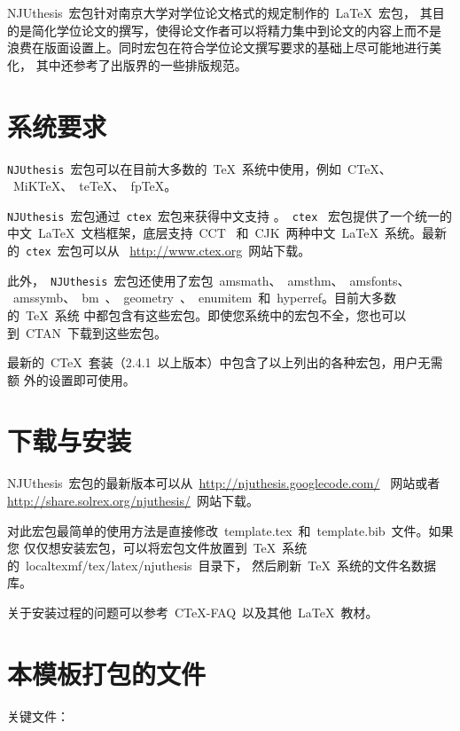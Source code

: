 \documentclass[oneside, phd]{njuthesis}
\begin{document}
NJUthesis~宏包针对南京大学对学位论文格式的规定制作的~\LaTeX{}~宏包，
其目的是简化学位论文的撰写，使得论文作者可以将精力集中到论文的内容上而不是
浪费在版面设置上。同时宏包在符合学位论文撰写要求的基础上尽可能地进行美化，
其中还参考了出版界的一些排版规范。

\section{系统要求}

\texttt{NJUthesis}~宏包可以在目前大多数的~\TeX{}~系统中使用，例如~C\TeX{}、
 ~MiK\TeX{}、~te\TeX{}、~fp\TeX{}。

\texttt{NJUthesis}~宏包通过~\texttt{ctex}~宏包来获得中文支持
。~\texttt{ctex}~ 宏包提供了一个统一的中文~\LaTeX{}~文档框架，底层支持~CCT~
和~CJK~两种中文~\LaTeX{}~系统。最新的~\texttt{ctex}~宏包可以从~
\url{http://www.ctex.org}~网站下载。

此外，~\texttt{NJUthesis}~宏包还使用了宏包~amsmath、~amsthm、~amsfonts、
 ~amssymb、~bm~、~geometry~、~enumitem~和~hyperref。目前大多数的~\TeX{}~系统
中都包含有这些宏包。即使您系统中的宏包不全，您也可以到~CTAN~下载到这些宏包。

最新的~C\TeX{}~套装（2.4.1~以上版本）中包含了以上列出的各种宏包，用户无需额
外的设置即可使用。

\section{下载与安装}

NJUthesis~宏包的最新版本可以从~\url{http://njuthesis.googlecode.com/}~
网站或者~
\url{http://share.solrex.org/njuthesis/}~网站下载。

对此宏包最简单的使用方法是直接修改~template.tex~和~template.bib~文件。如果您
仅仅想安装宏包，可以将宏包文件放置到~\TeX{}~系统的~localtexmf/tex/latex/njuthesis~目录下，
然后刷新~\TeX{}~系统的文件名数据库。

关于安装过程的问题可以参考~C\TeX{}-FAQ~以及其他~\LaTeX{}~教材。

\section{本模板打包的文件}

关键文件：
\end{document}
